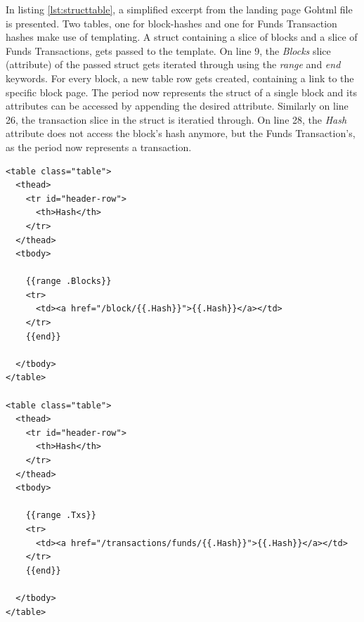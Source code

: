 In listing \ref{lst:structtable}, a simplified excerpt from the landing page Gohtml file is presented. Two tables, one for block-hashes and one for Funds Transaction hashes make use of templating. A struct containing a slice of blocks and a slice of Funds Transactions, gets passed to the template. On line 9, the \emph{Blocks} slice (attribute) of the passed struct gets iterated through using the \emph{range} and \emph{end} keywords. For every block, a new table row gets created, containing a link to the specific block page. The period now represents the struct of a single block and its attributes can be accessed by appending the desired attribute. Similarly on line 26, the transaction slice in the struct is iteratied through. On line 28, the \emph{Hash} attribute does not access the block's hash anymore, but the Funds Transaction's, as the period now represents a transaction.

\newpage

\begin{lstlisting}[caption={Block and Funds Transaction Tables Accessing a \emph{blocksandtx} Struct},captionpos=b,label={lst:structtable}]
<table class="table">
  <thead>
    <tr id="header-row">
      <th>Hash</th>
    </tr>
  </thead>
  <tbody>
  
    {{range .Blocks}}
    <tr>
      <td><a href="/block/{{.Hash}}">{{.Hash}}</a></td>
    </tr>
    {{end}}
    
  </tbody>
</table>

<table class="table">
  <thead>
    <tr id="header-row">
      <th>Hash</th>
    </tr>
  </thead>
  <tbody>
  
    {{range .Txs}}
    <tr>
      <td><a href="/transactions/funds/{{.Hash}}">{{.Hash}}</a></td>
    </tr>
    {{end}}
    
  </tbody>
</table>
\end{lstlisting}


